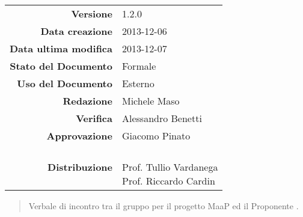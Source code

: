 
\newcommand{\Versione}{1.2.0}						%
\newcommand{\Data}{2013-12-06}						%
\newcommand{\DataUltimaModifica}{2013-12-07}
\newcommand{\TipoDocumento}{Verbale esterno 2013-12-05}		%




\begin{center}
\begin{tabular}{r|l}
\textbf{Versione} & \Versione{} \\
\textbf{Data creazione} & \Data{} \\
\textbf{Data ultima modifica} & \DataUltimaModifica{} \\
\textbf{Stato del Documento} & Formale \\		%
\textbf{Uso del Documento} & Esterno \\			%
\textbf{Redazione} & Michele Maso\\				%
\textbf{Verifica} & Alessandro Benetti\\		%
\textbf{Approvazione} & Giacomo Pinato\\		%
\textbf{Distribuzione} & \parbox[t]{4cm}{\NomeGruppo{} \\Prof. Tullio Vardanega \\ Prof. Riccardo Cardin \\ \Prop{} }\\
\end{tabular}
\end{center}

\vspace{0.05in}

\begin{abstract}
\begin{center}
Verbale di incontro tra il gruppo \NomeGruppo{} per il progetto MaaP ed il Proponente \Prop{}.
\end{center}
\end{abstract}

